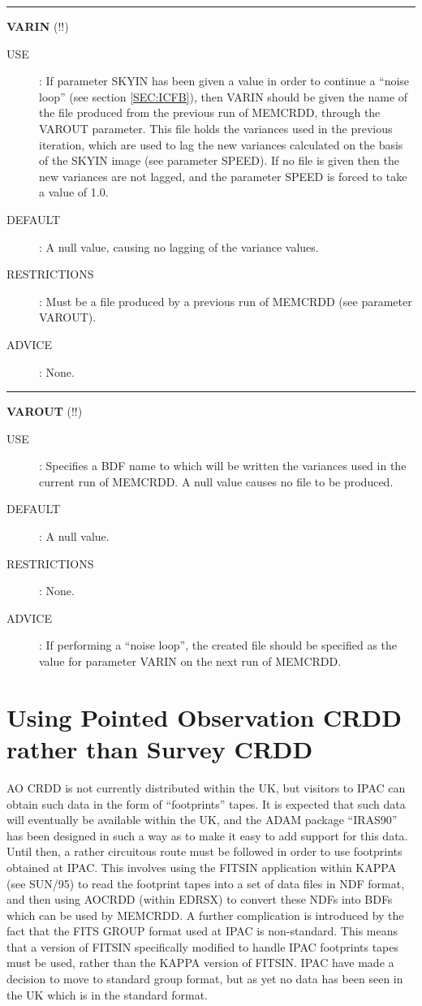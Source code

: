 \rule{\textwidth}{0.3mm}
{\Large {\bf VARIN} (!!)}
\begin{description}
\item [USE]:
If parameter SKYIN has been given a value in order to continue a ``noise loop''
(see section \ref {SEC:ICFB}), then VARIN should be given the name of the file 
produced from the previous run of MEMCRDD, through the VAROUT parameter. This 
file holds the variances used in the previous iteration, which are used to lag 
the new variances calculated on the basis of the SKYIN image (see parameter 
SPEED). If no file is given then the new variances are not lagged, and the 
parameter SPEED is forced to take a value of 1.0.
\item [DEFAULT]:
A null value, causing no lagging of the variance values.
\item [RESTRICTIONS]:
Must be a file produced by a previous run of MEMCRDD (see parameter VAROUT).
\item [ADVICE]:
None.
\end {description}

\rule{\textwidth}{0.3mm}
{\Large {\bf VAROUT} (!!)}
\begin{description}
\item [USE]:
Specifies a BDF name to which will be written the variances used in the 
current run of MEMCRDD. A null value causes no file to be produced.
\item [DEFAULT]:
A null value.
\item [RESTRICTIONS]:
None.
\item [ADVICE]:
If performing a ``noise loop'', the created file should be specified as the 
value for parameter VARIN on the next run of MEMCRDD.
\end {description}

\section{Using Pointed Observation CRDD rather than Survey CRDD}
\label {APP:AO}

AO CRDD is not currently distributed within the UK, but visitors to IPAC
can obtain such data in the form of ``footprints'' tapes. It is expected
that such data will eventually be available within the UK, and the ADAM
package ``IRAS90'' has been designed in such a way as to make it easy
to add support for this data. Until then, a rather circuitous route must
be followed in order to use footprints obtained at IPAC. This involves
using the FITSIN application within KAPPA (see SUN/95) to read the
footprint tapes into a set of data files in NDF format, and then using
AOCRDD (within EDRSX) to convert these NDFs into BDFs which can be used
by MEMCRDD. A further complication is introduced by the fact that the 
FITS GROUP format used at IPAC is non-standard. This means that a version
of FITSIN specifically modified to handle IPAC footprints tapes must be used,
rather than the KAPPA version of FITSIN. IPAC have made a decision to move
to standard group format, but as yet no data has been seen in the UK which
is in the standard format.

